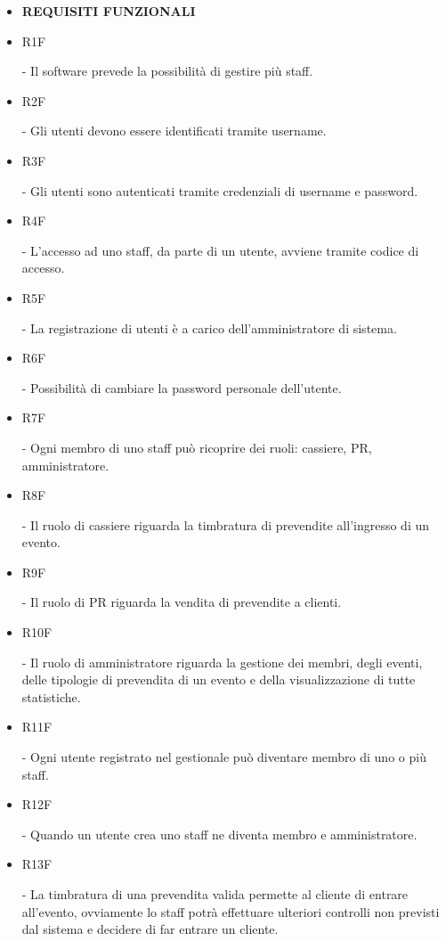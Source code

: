 \documentclass[a4paper]{article}
\begin{document}
\begin{itemize}
	
	\item \textbf{REQUISITI FUNZIONALI}
		
	\item \hypertarget{R1F}{R1F} - Il software prevede la possibilità di gestire più staff.
	
	
	\item \hypertarget{R2F}{R2F} - Gli utenti devono essere identificati tramite username.
	
	\item \hypertarget{R3F}{R3F} - Gli utenti sono autenticati tramite credenziali di username e password.
	\item \hypertarget{R4F}{R4F} - L'accesso ad uno staff, da parte di un utente, avviene tramite codice di accesso.	

	\item \hypertarget{R5F}{R5F} - La registrazione di utenti è a carico dell'amministratore di sistema.
	\item \hypertarget{R6F}{R6F} - Possibilità di cambiare la password personale dell'utente.
		
	\item \hypertarget{R7F}{R7F} - Ogni membro di uno staff può ricoprire dei ruoli: cassiere, PR, amministratore.	
	\item \hypertarget{R8F}{R8F} - Il ruolo di cassiere riguarda la timbratura di prevendite all'ingresso di un evento.
	\item \hypertarget{R9F}{R9F} - Il ruolo di PR riguarda la vendita di prevendite a clienti.
	\item \hypertarget{R10F}{R10F} - Il ruolo di amministratore riguarda la gestione dei membri, degli eventi, delle tipologie di prevendita di un evento e della visualizzazione di tutte statistiche.
	
	\item \hypertarget{R11F}{R11F} - Ogni utente registrato nel gestionale può diventare membro di uno o più staff. 
	
	\item \hypertarget{R12F}{R12F} - Quando un utente crea uno staff ne diventa membro e amministratore.
	
	\item \hypertarget{R13F}{R13F} - La timbratura di una prevendita valida permette al cliente di entrare all'evento, ovviamente lo staff potrà effettuare ulteriori controlli non previsti dal sistema e decidere di far entrare un cliente.
	

\end{itemize}
\end{document}
